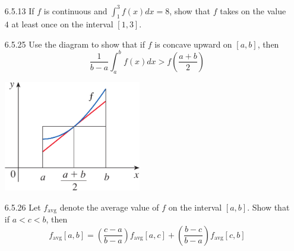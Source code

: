 \documentclass{article}
\begin{document}
\begin{enumerate}
\item[6.5.13]
    If $f$ is continuous and $\displaystyle \int_{1}^{3} f(x) dx=8$, show
    that $f$ takes on the value $4$ at least once on the interval $[1, 3]$.

\newpage

\item[6.5.25]
    Use the diagram to show that if $f$ is concave upward on $[a, b]$,
    then
    \[
        \frac{1}{b-a} \int_{a}^{b} f(x) dx > f\left( \frac{a+b}{2} \right)
    \]
    \begin{center}
        \includegraphics[width=6cm]{./png/6.5.25.png}
    \end{center}

\vspace{6cm}

\item[6.5.26]
    Let $f_{\text{avg}}$ denote the average value of $f$ on the
    interval $[a, b]$. Show that if $a < c < b$, then
    \[
        f_{\text{avg}}[a, b] = \left(\frac{c-a}{b-a}\right) f_{\text{avg}}[a, c]
        + \left( \frac{b-c}{b-a} \right) f_{\text{avg}}[c, b]
    \]

\end{enumerate}
\end{document}
